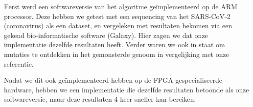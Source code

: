 Eerst werd een softwareversie van het algoritme ge\"implementeerd op de ARM processor. Deze hebben we getest met een sequencing van het SARS-CoV-2 (coronavirus) als een dataset, en vergeleken met resultaten bekomen via een gekend bio-informatische software (Galaxy). Hier zagen we dat onze implementatie dezelfde resultaten heeft. Verder waren we ook in staat om mutaties te ontdekken in het gemonsterde genoom in vergelijking met onze referentie.

Nadat we dit ook ge\"implementeerd hebben op de FPGA gespecialiseerde hardware, hebben we een implementatie die dezelfde resultaten betoonde als onze softwareversie, maar deze resultaten 4 keer sneller kan bereiken.